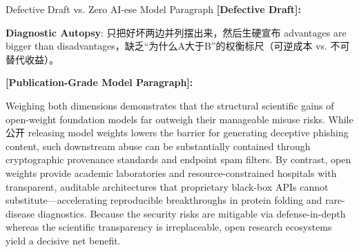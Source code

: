 \begin{ExampleBox}{Defective Draft vs. Zero AI-ese Model Paragraph}
\textbf{\color{TargetHighlight}[Defective Draft]:}\par
{}\par\vspace{4pt}
\textbf{Diagnostic Autopsy}: 只把好坏两边并列摆出来，然后生硬宣布 advantages are bigger than disadvantages，缺乏“为什么A大于B”的权衡标尺（可逆成本 vs. 不可替代收益）。\par\vspace{6pt}
\textbf{\color{AcadNavy}[Publication-Grade Model Paragraph]:}\par
Weighing both dimensions demonstrates that the structural scientific gains of open-weight foundation models far outweigh their manageable misuse risks. While公开 releasing model weights lowers the barrier for generating deceptive phishing content, such downstream abuse can be substantially contained through cryptographic provenance standards and endpoint spam filters. By contrast, open weights provide academic laboratories and resource-constrained hospitals with transparent, auditable architectures that proprietary black-box APIs cannot substitute---accelerating reproducible breakthroughs in protein folding and rare-disease diagnostics. Because the security risks are mitigable via defense-in-depth whereas the scientific transparency is irreplaceable, open research ecosystems yield a decisive net benefit.
\end{ExampleBox}
